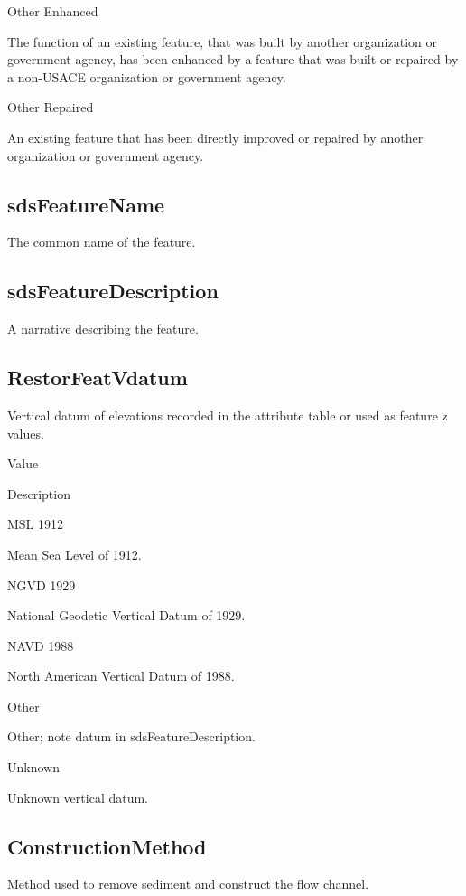 \documentclass[
  letterpaper,
  DIV=11,
  numbers=noendperiod]{scrreprt}
\begin{document}
Other Enhanced

The function of an existing feature, that was built by another
organization or government agency, has been enhanced by a feature that
was built or repaired by a non-USACE organization or government agency.

Other Repaired

An existing feature that has been directly improved or repaired by
another organization or government agency.

\subsection{sdsFeatureName}\label{sdsfeaturename-5}

The common name of the feature.

\subsection{sdsFeatureDescription}\label{sdsfeaturedescription-5}

A narrative describing the feature.

\subsection{RestorFeatVdatum}\label{restorfeatvdatum-5}

Vertical datum of elevations recorded in the attribute table or used as
feature z values.

Value

Description

MSL 1912

Mean Sea Level of 1912.

NGVD 1929

National Geodetic Vertical Datum of 1929.

NAVD 1988

North American Vertical Datum of 1988.

Other

Other; note datum in sdsFeatureDescription.

Unknown

Unknown vertical datum.

\subsection{ConstructionMethod}\label{constructionmethod}

Method used to remove sediment and construct the flow channel.
\end{document}
